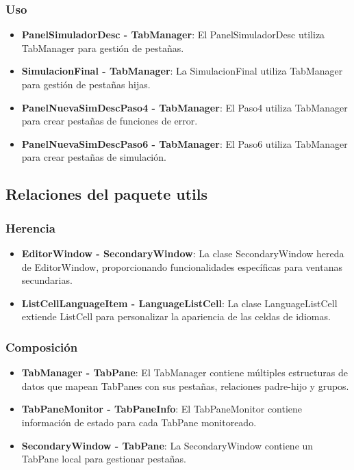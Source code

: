 \subsubsection{Uso}
\begin{itemize}
    \item \textbf{PanelSimuladorDesc - TabManager}: El PanelSimuladorDesc utiliza TabManager para gestión de pestañas.
    \item \textbf{SimulacionFinal - TabManager}: La SimulacionFinal utiliza TabManager para gestión de pestañas hijas.
    \item \textbf{PanelNuevaSimDescPaso4 - TabManager}: El Paso4 utiliza TabManager para crear pestañas de funciones de error.
    \item \textbf{PanelNuevaSimDescPaso6 - TabManager}: El Paso6 utiliza TabManager para crear pestañas de simulación.
\end{itemize}

\subsection{Relaciones del paquete utils}

\subsubsection{Herencia}
\begin{itemize}
    \item \textbf{EditorWindow - SecondaryWindow}: La clase SecondaryWindow hereda de EditorWindow, proporcionando funcionalidades específicas para ventanas secundarias.
    \item \textbf{ListCell\<LanguageItem\> - LanguageListCell}: La clase LanguageListCell extiende ListCell para personalizar la apariencia de las celdas de idiomas.
\end{itemize}

\subsubsection{Composición}
\begin{itemize}
    \item \textbf{TabManager - TabPane}: El TabManager contiene múltiples estructuras de datos que mapean TabPanes con sus pestañas, relaciones padre-hijo y grupos.
    \item \textbf{TabPaneMonitor - TabPaneInfo}: El TabPaneMonitor contiene información de estado para cada TabPane monitoreado.
    \item \textbf{SecondaryWindow - TabPane}: La SecondaryWindow contiene un TabPane local para gestionar pestañas.
\end{itemize}

